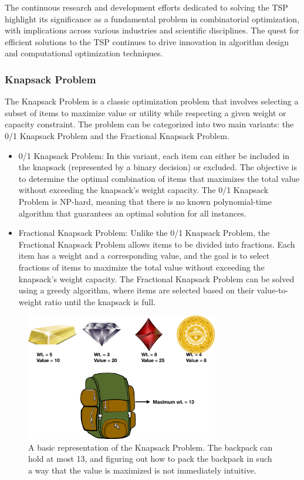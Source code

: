 \documentclass[11pt]{report}
\begin{document}
        The continuous research and development efforts dedicated to solving the TSP highlight its significance as a fundamental problem in combinatorial optimization, with implications across various industries and scientific disciplines. The quest for efficient solutions to the TSP continues to drive innovation in algorithm design and computational optimization techniques.

        \subsubsection{Knapsack Problem}
        The Knapsack Problem is a classic optimization problem that involves selecting a subset of items to maximize value or utility while respecting a given weight or capacity constraint\cite{CACCHIANI2022105693}. The problem can be categorized into two main variants: the 0/1 Knapsack Problem and the Fractional Knapsack Problem.

        \begin{itemize}
            \item 0/1 Knapsack Problem: In this variant, each item can either be included in the knapsack (represented by a binary decision) or excluded. The objective is to determine the optimal combination of items that maximizes the total value without exceeding the knapsack's weight capacity. The 0/1 Knapsack Problem is NP-hard, meaning that there is no known polynomial-time algorithm that guarantees an optimal solution for all instances.

           \item Fractional Knapsack Problem: Unlike the 0/1 Knapsack Problem, the Fractional Knapsack Problem allows items to be divided into fractions. Each item has a weight and a corresponding value, and the goal is to select fractions of items to maximize the total value without exceeding the knapsack's weight capacity. The Fractional Knapsack Problem can be solved using a greedy algorithm, where items are selected based on their value-to-weight ratio until the knapsack is full.
        \end{itemize}

        \begin{figure}[h!]
            \centering
            \includegraphics[width=0.75\textwidth,keepaspectratio]{Images/knap1.png}
            \caption{A basic representation of the Knapsack Problem. The backpack can hold at most 13, and figuring out how to pack the backpack in such a way that the value is maximized is not immediately intuitive.}
            \label{fig:knap-demo}
        \end{figure}
\end{document}
